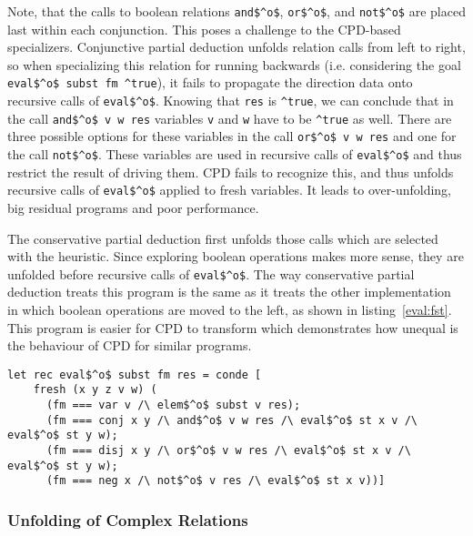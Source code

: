 Note, that the calls to boolean relations \lstinline{and$^o$}, \lstinline{or$^o$}, and \lstinline{not$^o$} are placed last within each conjunction.
This poses a challenge to the CPD-based specializers.
Conjunctive partial deduction unfolds relation calls from left to right, so when specializing this relation for running backwards (i.e. considering the goal \lstinline{eval$^o$ subst fm ^true}), it fails to propagate the direction data onto recursive calls of \lstinline{eval$^o$}.
Knowing that \lstinline{res} is \lstinline{^true}, we can conclude that in the call \lstinline{and$^o$ v w res} variables \lstinline{v} and \lstinline{w} have to be \lstinline{^true} as well.
There are three possible options for these variables in the call \lstinline{or$^o$ v w res} and one for the call \lstinline{not$^o$}.
These variables are used in recursive calls of \lstinline{eval$^o$} and thus restrict the result of driving them.
CPD fails to recognize this, and thus unfolds recursive calls of \lstinline{eval$^o$} applied to fresh variables.
It leads to over-unfolding, big residual programs and poor performance.

The conservative partial deduction first unfolds those calls which are selected with the heuristic.
Since exploring boolean operations makes more sense, they are unfolded before recursive calls of \lstinline{eval$^o$}.
The way conservative partial deduction treats this program is the same as it treats the other implementation in which boolean operations are moved to the left, as shown in listing~\ref{eval:fst}.
This program is easier for CPD to transform which demonstrates how unequal is the behaviour of CPD for similar programs.

\begin{figure*}[!h]
  \centering
  \begin{minipage}{0.95\textwidth}
    \begin{lstlisting}[label={eval:fst}, caption={Evaluator of formulas with boolean operation second}, captionpos=b, frame=tb]
  let rec eval$^o$ subst fm res = conde [
    fresh (x y z v w) (
      (fm === var v /\ elem$^o$ subst v res);
      (fm === conj x y /\ and$^o$ v w res /\ eval$^o$ st x v /\ eval$^o$ st y w);
      (fm === disj x y /\ or$^o$ v w res /\ eval$^o$ st x v /\ eval$^o$ st y w);
      (fm === neg x /\ not$^o$ v res /\ eval$^o$ st x v))]
    \end{lstlisting}
  \end{minipage}
\end{figure*}

\subsubsection{Unfolding of Complex Relations}

